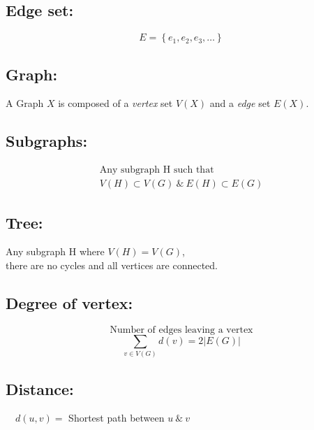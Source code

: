 \documentclass[../../mathematics_cheat_sheet.tex]{subfiles}
\begin{document}
\subsection{Edge set:}
\[
  E=\left\{e_{1}, e_{2}, e_{3}, \ldots\right\}
\]
\subsection{Graph:}
A Graph $X$ is composed of a \emph{vertex} set $V(X)$ and a \emph{edge} set $E(X)$.
\begin{center}
\end{center}


\subsection{Subgraphs:}
\[
  \begin{array}{cc}
    \text{Any subgraph } \mathrm{H} \text{ such that}\\
    V(H) \subset V(G) ~\&~ E(H) \subset E(G)
  \end{array}
\]
\begin{center}
  \quad
\end{center}


\subsection{Tree:}
\begin{center}
  Any subgraph $\mathrm{H}$ where $V(H)=V(G)$,\\ there are no cycles and all vertices are connected.
\end{center}
%
\subsection{Degree of vertex:}
\[\text{Number of edges leaving a vertex}\]
\[\sum_{v \in V(G)} d(v)=2|E(G)| \]
%
%
\subsection{Distance:}
\begin{center}
  $\quad d(u, v)=$ Shortest path between $u ~\&~ v$
\end{center}
%
\end{document}
